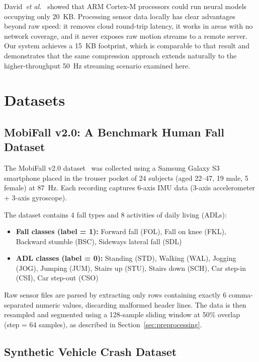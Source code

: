 \documentclass[journal]{IEEEtran}
\begin{document}
David~\textit{et al.}~\cite{david2021} showed that ARM Cortex-M processors
could run neural models occupying only 20~KB. Processing sensor data locally
has clear advantages beyond raw speed: it removes cloud round-trip latency,
it works in areas with no network coverage, and it never exposes raw motion
streams to a remote server. Our system achieves a 15~KB footprint, which is
comparable to that result and demonstrates that the same compression approach
extends naturally to the higher-throughput 50~Hz streaming scenario examined here.


\section{Datasets}
\label{sec:dataset}

\subsection{MobiFall v2.0: A Benchmark Human Fall Dataset}

The MobiFall v2.0 dataset~\cite{mobifall} was collected using a Samsung Galaxy
S3 smartphone placed in the trouser pocket of 24 subjects (aged 22--47, 19 male,
5 female) at 87~Hz. Each recording captures 6-axis IMU data
(3-axis accelerometer + 3-axis gyroscope).

The dataset contains 4 fall types and 8 activities of daily living (ADLs):

\begin{itemize}
  \item \textbf{Fall classes (label = 1):} Forward fall (FOL), Fall on knee (FKL),
        Backward stumble (BSC), Sideways lateral fall (SDL)
  \item \textbf{ADL classes (label = 0):} Standing (STD), Walking (WAL), Jogging (JOG),
        Jumping (JUM), Stairs up (STU), Stairs down (SCH), Car step-in (CSI),
        Car step-out (CSO)
\end{itemize}

Raw sensor files are parsed by extracting only rows containing exactly 6
comma-separated numeric values, discarding malformed header lines. The
data is then resampled and segmented using a 128-sample sliding window
at 50\% overlap (step = 64 samples), as described in Section~\ref{sec:preprocessing}.

\subsection{Synthetic Vehicle Crash Dataset}
\end{document}
